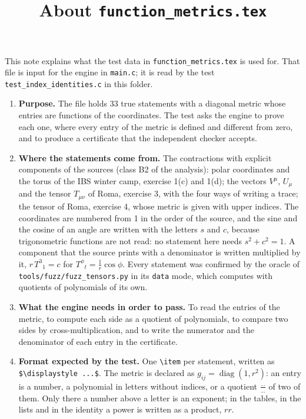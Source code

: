 \documentclass[11pt,a4paper]{article}
\title{About \texttt{function\_metrics.tex}}
\author{}
\date{}
\begin{document}
\maketitle
This note explains what the test data in \texttt{function\_metrics.tex} is used for. That file is input for the engine in \texttt{main.c}; it is read by the test \texttt{test\_index\_identities.c} in this folder.

\begin{enumerate}
\item \textbf{Purpose.} The file holds 33 true statements with a diagonal metric whose entries are functions of the coordinates. The test asks the engine to prove each one, where every entry of the metric is defined and different from zero, and to produce a certificate that the independent checker accepts.

\item \textbf{Where the statements come from.} The contractions with explicit components of the sources (class B2 of the analysis): polar coordinates and the torus of the IBS winter camp, exercise 1(c) and 1(d); the vectors $V^{\mu}$, $U_{\mu}$ and the tensor $T_{\mu\nu}$ of Roma, exercise 3, with the four ways of writing a trace; the tensor of Roma, exercise 4, whose metric is given with upper indices. The coordinates are numbered from 1 in the order of the source, and the sine and the cosine of an angle are written with the letters $s$ and $c$, because trigonometric functions are not read: no statement here needs $s^{2} + c^{2} = 1$. A component that the source prints with a denominator is written multiplied by it, $r\,T^{3}{}_{1} = c$ for $T^{\phi}{}_{t} = \frac{1}{r}\cos\phi$. Every statement was confirmed by the oracle of \texttt{tools/fuzz/fuzz\_tensors.py} in its \texttt{data} mode, which computes with quotients of polynomials of its own.

\item \textbf{What the engine needs in order to pass.} To read the entries of the metric, to compute each side as a quotient of polynomials, to compare two sides by cross-multiplication, and to write the numerator and the denominator of each entry in the certificate.

\item \textbf{Format expected by the test.} One \texttt{\textbackslash item} per statement, written as \texttt{\$\textbackslash displaystyle ...\$}. The metric is declared as $g_{ij} = \operatorname{diag}(1, r^{2})$: an entry is a number, a polynomial in letters without indices, or a quotient $\frac{\dots}{\dots}$ of two of them. Only there a number above a letter is an exponent; in the tables, in the lists and in the identity a power is written as a product, $r r$.


\end{enumerate}
\end{document}
